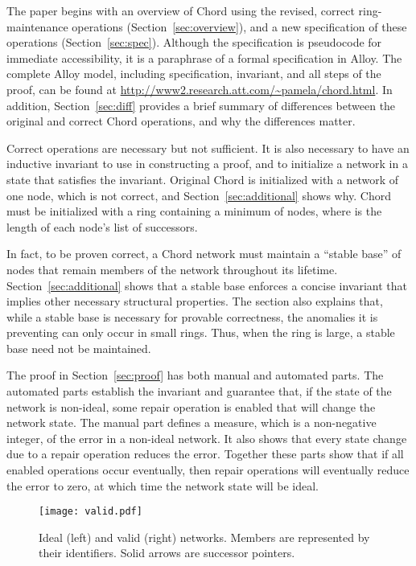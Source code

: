 \documentclass[conference]{IEEEtran}
\begin{document}
The paper begins with an overview of Chord using the revised, correct
ring-maintenance operations
(Section~\ref{sec:overview}), and a new specification of these
operations (Section~\ref{sec:spec}).
Although the specification
is pseudocode for immediate accessibility, it is a paraphrase
of a formal specification in Alloy.
The complete Alloy model, including specification, invariant, and 
all steps of the proof,
can be found at
\url{http://www2.research.att.com/~pamela/chord.html}.
In addition, Section~\ref{sec:diff} provides a brief summary of 
differences between the original and correct Chord operations,
and why the differences matter.

Correct operations are necessary but not sufficient.
It is also necessary to have an inductive invariant
to use in constructing a proof, and to
initialize a network in a state that satisfies the invariant.
Original Chord is initialized with a network of one node,
which is
not correct, and
Section~\ref{sec:additional} shows why.
Chord must be initialized 
with a ring containing a minimum of  nodes, where
 is the length of each node's list of successors.

In fact, to be proven correct, a Chord network must maintain a
``stable base'' of  nodes that
remain members of the network throughout its lifetime.
Section~\ref{sec:additional} shows that
a stable base enforces a concise invariant that implies
other necessary structural properties.
The section also explains that, while a stable base is necessary for
provable correctness, the anomalies it is preventing can only occur
in small rings.
Thus, when the ring is large, a stable base need not be maintained.

The proof in
Section~\ref{sec:proof}
has both manual and automated parts.
The automated parts establish the invariant and guarantee that, if
the state of the network is non-ideal, some repair
operation is enabled that
will change the network state.
The manual part defines a measure, which is a non-negative integer,
of the error in a non-ideal network.
It also shows that every state change due to a repair operation reduces
the error.
Together these parts show that if all enabled operations
occur eventually, then repair operations will eventually reduce
the error to zero, at which time the network state will be ideal.

\begin{figure}
\centering
\texttt{[image: valid.pdf]}
\caption{Ideal (left) and valid (right) networks.
Members are represented by their identifiers.
Solid arrows are successor pointers.}
\label{fig:valid}
\end{figure}
\end{document}
